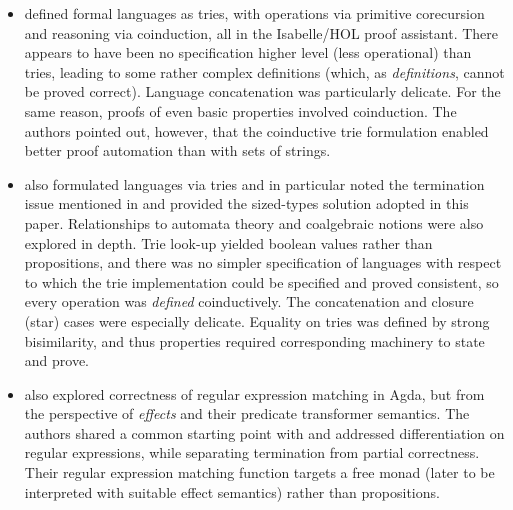 \documentclass[acmsmall,screen,timestamp]{acmart}  %
\begin{document}
\begin{itemize}
\item \citet{Traytel2017} defined formal languages as tries, with operations via primitive corecursion and reasoning via coinduction, all in the Isabelle/HOL proof assistant.
There appears to have been no specification higher level (less operational) than tries, leading to some rather complex definitions (which, as \emph{definitions}, cannot be proved correct).
Language concatenation was particularly delicate.
For the same reason, proofs of even basic properties involved coinduction.
The authors pointed out, however, that the coinductive trie formulation enabled better proof automation than with sets of strings.

\item \citet{Abel2016} also formulated languages via tries and in particular noted the termination issue mentioned in  and provided the sized-types solution adopted in this paper.
Relationships to automata theory and coalgebraic notions were also explored in depth.
Trie look-up yielded boolean values rather than propositions, and there was no simpler specification of languages with respect to which the trie implementation could be specified and proved consistent, so every operation was \emph{defined} coinductively.
The concatenation and closure (star) cases were especially delicate.
Equality on tries was defined by strong bisimilarity, and thus properties required corresponding machinery to state and prove.


\item \citet{BaanenSwierstra2020} also explored correctness of regular expression matching in Agda, but from the perspective of \emph{effects} and their predicate transformer semantics.
The authors shared a common starting point with \citet{KorkutEtAl2016} and addressed differentiation on regular expressions, while separating termination from partial correctness.
Their regular expression matching function targets a free monad (later to be interpreted with suitable effect semantics) rather than propositions.

\end{itemize}
\end{document}
